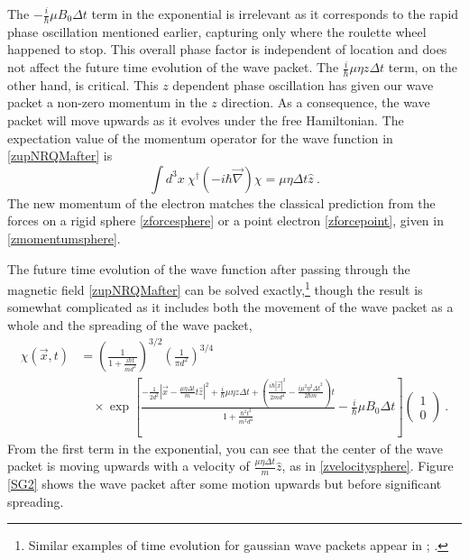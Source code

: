\documentclass[onecolumn,secnumarabic,amsmath,amssymb,balancelastpage,nofootinbib]{article}
\begin{document}
The $-\frac{i}{\hbar}\mu B_0 \Delta t$ term in the exponential is irrelevant as it corresponds to the rapid phase oscillation mentioned earlier, capturing only where the roulette wheel happened to stop.  This overall phase factor is independent of location and does not affect the future time evolution of the wave packet.  The $\frac{i}{\hbar}\mu \eta z \Delta t$ term, on the other hand, is critical.  This $z$ dependent phase oscillation has given our wave packet a non-zero momentum in the $z$ direction.  As a consequence, the wave packet will move upwards as it evolves under the free Hamiltonian. The expectation value of the momentum operator for the wave function in \eqref{zupNRQMafter} is
\begin{equation}
\int d^3 x \ \chi^{\dagger} \left( -i \hbar \vec{\nabla} \right) \chi = \mu \eta \Delta t \hat{z}
\ .
\label{momentumexpectation}
\end{equation}
The new momentum of the electron matches the classical prediction from the forces on a rigid sphere \eqref{zforcesphere} or a point electron \eqref{zforcepoint}, given in \eqref{zmomentumsphere}.

The future time evolution of the wave function after passing through the magnetic field \eqref{zupNRQMafter} can be solved exactly,\footnote{Similar examples of time evolution for gaussian wave packets appear in \citet[problem 2.43]{griffithsQM}; \citet[problem 5.8]{ballentine}.} though the result is somewhat complicated as it includes both the movement of the wave packet as a whole and the spreading of the wave packet,
\begin{align}
\chi(\vec{x},t) &= \left(\frac{1}{1+ \frac{i \hbar t}{m d^2}}\right)^{3/2} \left(\frac{1}{\pi d^2}\right)^{3/4} 
\\
&\quad\times \exp\left[\frac{-\frac{1}{2d^2}|\vec{x}-\frac{\mu \eta \Delta t}{m}t\hat{z}|^2 + \frac{i}{\hbar}\mu \eta z \Delta t+\left(\frac{i \hbar |\vec{x}|^2}{2 m d^4}-\frac{i \mu^2 \eta^2 \Delta t^2}{2 \hbar m}\right)t}{1+\frac{\hbar^2 t^2}{m^2 d^4}}- \frac{i}{\hbar}\mu B_0 \Delta t\right] \left(\begin{matrix} 1\\0 \end{matrix}\right)\ .
\end{align}
From the first term in the exponential, you can see that the center of the wave packet is moving upwards with a velocity of $\frac{\mu \eta \Delta t}{m} \hat{z}$, as in \eqref{zvelocitysphere}.  Figure \ref{SG2} shows the wave packet after some motion upwards but before significant spreading.
\end{document}
